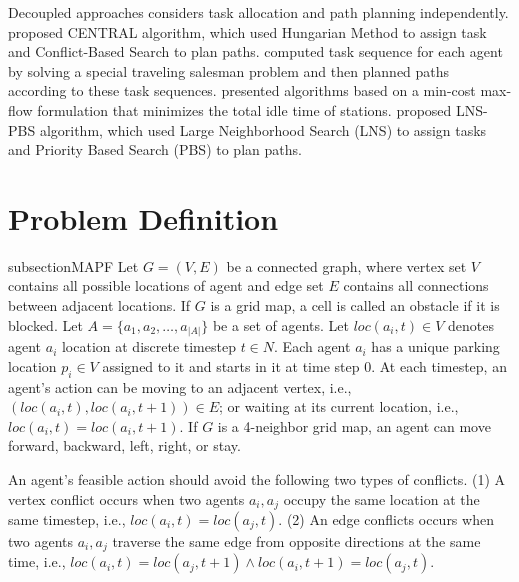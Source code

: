 \documentclass[letterpaper]{article} %
\begin{document}
Decoupled approaches considers task allocation and path planning independently. 
\citet{ma2017lifelong} proposed CENTRAL algorithm, 
which used Hungarian Method \cite{kuhn1955hungarian} to assign task and Conflict-Based Search \cite{sharon2015conflict} to plan paths. 
\citet{liu2019task} computed task sequence for each agent by solving a special traveling salesman problem and then planned paths according to these task sequences. 
\citet{kou2020idle} presented algorithms based on a min-cost max-flow formulation that minimizes the total idle time of stations. 
\citet{xu2022multi} proposed LNS-PBS algorithm, which used Large Neighborhood Search (LNS) to assign tasks and Priority Based Search (PBS) to plan paths. 

\section{Problem Definition}

subsection{MAPF}
Let $G = (V,E)$ be a connected graph, where vertex set $V$ contains all possible locations of agent and edge set $E$ contains all connections between adjacent locations. 
If $G$ is a grid map, a cell is called an obstacle if it is blocked. 
Let $ A = \{ a_1, a_2, \dots, a_{|A|} \}$ be a set of agents.
Let $ loc(a_i,t) \in V $ denotes agent $a_i$ location at discrete timestep $t \in N$. 
Each agent $a_i$ has a unique parking location $ p_i \in V $ assigned to it and starts in it at time step 0.
At each timestep, an agent's action can be moving to an adjacent vertex, i.e., $ (loc(a_i, t), loc(a_i, t+1)) \in E$; or waiting at its current location, i.e., $loc(a_i, t) = loc(a_i, t+1)$.
If $G$ is a 4-neighbor grid map, an agent can move forward, backward, left, right, or stay. 

An agent's feasible action should avoid the following two types of conflicts.
(1) A vertex conflict occurs when two agents $a_i,a_j$ occupy the same location at the same timestep, i.e., $loc(a_i, t) = loc(a_j, t)$.
(2) An edge conflicts occurs when two agents $a_i,a_j$ traverse the same edge from opposite directions at the same time, i.e., $loc(a_i, t) = loc(a_j, t+1) \land loc(a_i, t+1) = loc(a_j, t)$. 
\end{document}
